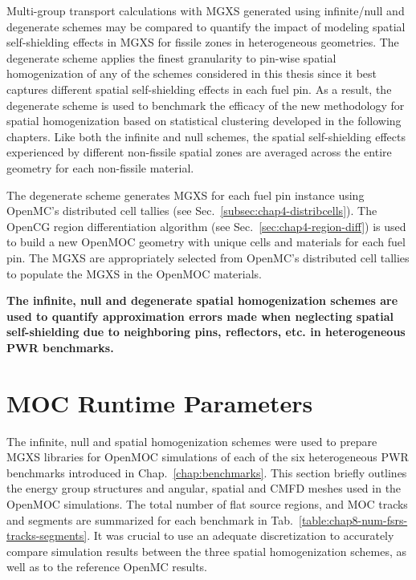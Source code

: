 Multi-group transport calculations with \ac{MGXS} generated using infinite/null and degenerate schemes may be compared to quantify the impact of modeling spatial self-shielding effects in \ac{MGXS} for fissile zones in heterogeneous geometries. The degenerate scheme applies the finest granularity to pin-wise spatial homogenization of any of the schemes considered in this thesis since it best captures different spatial self-shielding effects in each fuel pin. As a result, the degenerate scheme is used to benchmark the efficacy of the new methodology for spatial homogenization based on statistical clustering developed in the following chapters. Like both the infinite and null schemes, the spatial self-shielding effects experienced by different non-fissile spatial zones are averaged across the entire geometry for each non-fissile material.

The degenerate scheme generates \ac{MGXS} for each fuel pin instance using OpenMC's distributed cell tallies (see Sec.~\ref{subsec:chap4-distribcells}). The OpenCG region differentiation algorithm (see Sec.~\ref{sec:chap4-region-diff}) is used to build a new OpenMOC geometry with unique cells and materials for each fuel pin. The \ac{MGXS} are appropriately selected from OpenMC's distributed cell tallies to populate the \ac{MGXS} in the OpenMOC materials.

\begin{emphbox}
\textbf{The infinite, null and degenerate spatial homogenization schemes are used to quantify approximation errors made when neglecting spatial self-shielding due to neighboring pins, reflectors, etc. in heterogeneous \ac{PWR} benchmarks.}
\end{emphbox}


\section{\ac{MOC} Runtime Parameters}
\label{sec:chap8-moc-params}

The infinite, null and spatial homogenization schemes were used to prepare \ac{MGXS} libraries for OpenMOC simulations of each of the six heterogeneous \ac{PWR} benchmarks introduced in Chap.~\ref{chap:benchmarks}. This section briefly outlines the energy group structures and angular, spatial and \ac{CMFD} meshes used in the OpenMOC simulations. The total number of flat source regions, and \ac{MOC} tracks and segments are summarized for each benchmark in Tab.~\ref{table:chap8-num-fsrs-tracks-segments}. It was crucial to use an adequate discretization to accurately compare simulation results between the three spatial homogenization schemes, as well as to the reference OpenMC results.

